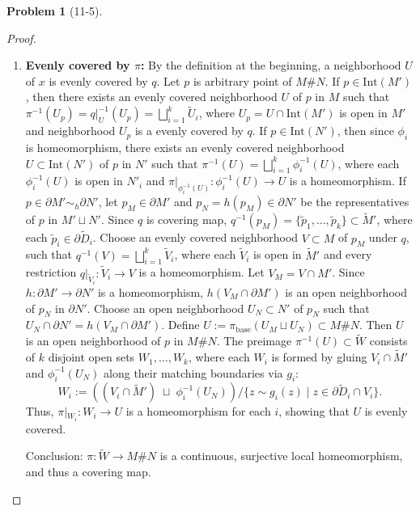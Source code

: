 \documentclass[11pt, a4paper]{article}
\theoremstyle{definition}
\newtheorem{prob}{Problem}
\newenvironment{problem}[1][]{\begin{prob}[#1]\normalfont}{\end{prob}\vspace{1.5em}}
\begin{document}
\begin{problem}[11-5]
\begin{proof}
\begin{enumerate}
        \item \textbf{Evenly covered by $\pi$:} By the definition at the beginning, a neighborhood $U$ of $x$ is 
        evenly covered by $q$. Let $p$ is arbitrary point of $M \# N$. If $p \in \text{Int}(M')$, then there exists an 
        evenly covered neighborhood $U$ of $p$ in $M$ such that $\pi^{-1}(U_p) = q|_{U}^{-1}(U_p) = \bigsqcup_{i=1}^k \widetilde{U}_i$, 
        where $U_p = U \cap \text{Int}(M')$ is open in $M'$ and neighborhood $U_p$ is a evenly covered by $q$. If 
        $p \in \text{Int}(N')$, then since $\phi_i$ is homeomorphism, there exists an evenly covered neighborhood 
        $U \subset \text{Int}(N')$ of $p$ in $N'$ such that $\pi^{-1}(U) = \bigsqcup_{i=1}^k \phi_i^{-1}(U)$, where 
        each $\phi_i^{-1}(U)$ is open in $N'_i$ and $\pi|_{\phi_i^{-1}(U)}: \phi_i^{-1}(U) \to U$ is a homeomorphism. 
        If $p \in \partial M' \sim_h \partial N'$, let $p_M \in \partial M'$ and $p_N = h(p_M) \in \partial N'$ be the 
        representatives of $p$ in $M' \sqcup N'$. Since $q$ is covering map, 
        $q^{-1}(p_M) = \{\widetilde{p}_1, \dots, \widetilde{p}_k\} \subset \widetilde{M}'$, where each 
        $\widetilde{p}_i \in \partial \widetilde{D}_i$. Choose an evenly covered neighborhood $V \subset M$ of $p_M$ 
        under $q$, such that $q^{-1}(V) = \bigsqcup_{i=1}^k \widetilde{V}_i$, where each $\widetilde{V}_i$ is open in 
        $\widetilde{M}'$ and every restriction $q|_{\widetilde{V}_i}: \widetilde{V}_i \to V$ is a homeomorphism. Let 
        $V_M = V \cap M'$. Since $h: \partial M' \to \partial N'$ is a homeomorphism, $h(V_M \cap \partial M')$ is an 
        open neighborhood of $p_N$ in $\partial N'$. Choose an open neighborhood $U_N \subset N'$ of $p_N$ such that 
        $U_N \cap \partial N' = h(V_M \cap \partial M')$. Define $U := \pi_{\text{base}}(U_M \sqcup U_N) \subset M \# N$. 
        Then $U$ is an open neighborhood of $p$ in $M \# N$. The preimage $\pi^{-1}(U) \subset \widetilde{W}$ 
        consists of $k$ disjoint open sets $W_1, \dots, W_k$, where each $W_i$ is formed by gluing 
        $V_i \cap \widetilde{M}'$ and $\phi_i^{-1}(U_N)$ along their matching boundaries via $g_i$:
        $$W_i := \left( (V_i \cap \widetilde{M}') \;\sqcup\; \phi_i^{-1}(U_N) \right) \Big/ \Big\{ z \sim g_i(z) \;\Big\vert{}\; z \in \partial \widetilde{D}_i \cap V_i \Big\}.$$
        Thus, $\pi\vert{}_{W_i} : W_i \to U$ is a homeomorphism for each $i$, showing that $U$ is evenly covered.

    Conclusion: $\pi : \widetilde{W} \to M \# N$ is a continuous, surjective local homeomorphism, and thus a covering 
    map.

    \end{enumerate}

    \end{proof}
\end{problem}
\end{document}

